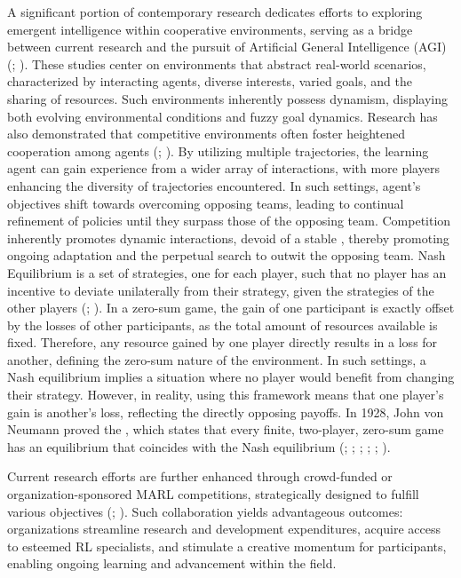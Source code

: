 \noindent A significant portion of contemporary research dedicates efforts to exploring emergent intelligence within cooperative environments, serving as a bridge between current research and the pursuit of Artificial General Intelligence (AGI) (\textcolor{deepblue}{\cite{lowe2020multiagent}; \cite{foerster2018learning}}). These studies center on environments that abstract real-world scenarios, characterized by interacting agents, diverse interests, varied goals, and the sharing of resources. Such environments inherently possess dynamism, displaying both evolving environmental conditions and fuzzy goal dynamics. Research has also demonstrated that competitive environments often foster heightened cooperation among agents (\textcolor{deepblue}{\cite{openai2019dota}; \cite{baker2020emergent}}). By utilizing multiple trajectories, the learning agent can gain experience from a wider array of interactions, with more players enhancing the diversity of trajectories encountered. In such settings, agent's objectives shift towards overcoming opposing teams, leading to continual refinement of policies until they surpass those of the opposing team. Competition inherently promotes dynamic interactions, devoid of a stable , thereby promoting ongoing adaptation and the perpetual search to outwit the opposing team. Nash Equilibrium is a set of strategies, one for each player, such that no player has an incentive to deviate unilaterally from their strategy, given the strategies of the other players (\cite{doi:10.1073/pnas.36.1.48}; \cite{Nash1951}). In a zero-sum game, the gain of one participant is exactly offset by the losses of other participants, as the total amount of resources available is fixed. Therefore, any resource gained by one player directly results in a loss for another, defining the zero-sum nature of the environment. In such settings, a Nash equilibrium implies a situation where no player would benefit from changing their strategy. However, in reality, using this framework means that one player's gain is another's loss, reflecting the directly opposing payoffs. In 1928, John von Neumann proved the , which states that every finite, two-player, zero-sum game has an equilibrium that coincides with the Nash equilibrium (\textcolor{deepblue}{\cite{Neumann1928}; \cite{doi:10.1073/pnas.36.1.48}; \cite{Nash1951}; \cite{books/daglib/0023252}; \cite{SCHULMAN2019336}; \cite{LI202016932}}).

\bigskip

\noindent Current research efforts are further enhanced through crowd-funded or organization-sponsored MARL competitions, strategically designed to fulfill various objectives (\textcolor{deepblue}{\cite{suarez2019neural}; \cite{agapiou2023melting}}). Such collaboration yields advantageous outcomes: organizations streamline research and development expenditures, acquire access to esteemed RL specialists, and stimulate a creative momentum for participants, enabling ongoing learning and advancement within the field. 

